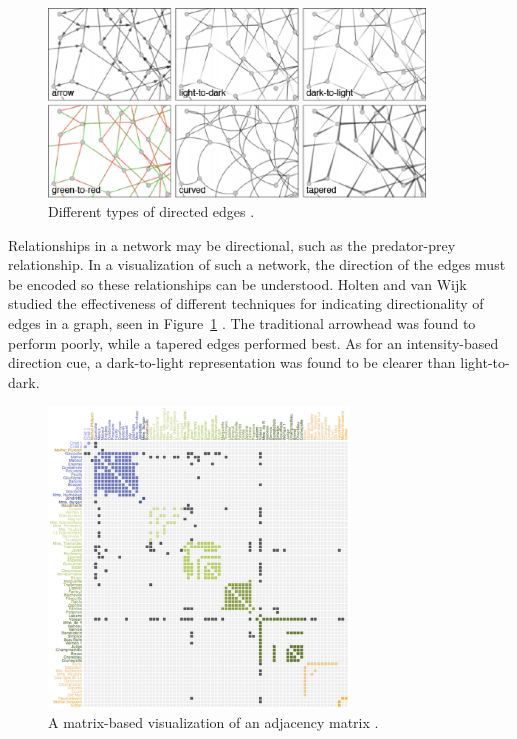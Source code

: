 \begin{figure}[h]
	\centering
	\includegraphics[width=10cm]{figures/eps/directedEdges.eps}
	\caption{Different types of directed edges \cite{holten2009}.}
	\label{fig:directedEdges}
\end{figure}

Relationships in a network may be directional, such as the predator-prey relationship.  In a visualization of such a network, the direction of the edges must be encoded so these relationships can be understood.  Holten and van Wijk studied the effectiveness of different techniques for indicating directionality of edges in a graph, seen in Figure~\ref{fig:directedEdges} \cite{holten2009}.  The traditional arrowhead was found to perform poorly, while a tapered edges performed best.  As for an intensity-based direction cue, a dark-to-light representation was found to be clearer than light-to-dark.

\begin{figure}[h]
	\centering
	\includegraphics[width=8cm]{figures/eps/matrix.eps}
	\caption{A matrix-based visualization of an adjacency matrix \cite{knuth1993}.}
	\label{fig:matrix}
\end{figure}

